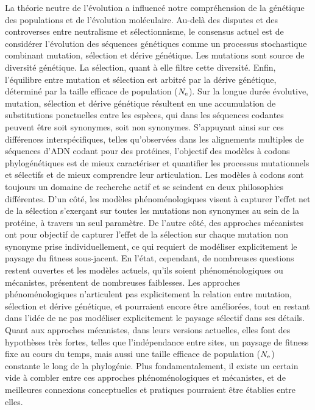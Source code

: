 La théorie neutre de l’évolution a influencé notre compréhension de la génétique des populations et de l'évolution moléculaire.
Au-delà des disputes et des controverses entre neutralisme et sélectionnisme, le consensus actuel est de considérer l'évolution des séquences génétiques comme un processus stochastique combinant mutation, sélection et dérive génétique.
Les mutations sont source de diversité génétique.
La sélection, quant à elle filtre cette diversité.
Enfin, l'équilibre entre mutation et sélection est arbitré par la dérive génétique, déterminé par la taille efficace de population ($N_{\text{e}}$).
Sur la longue durée évolutive, mutation, sélection et dérive génétique résultent en une accumulation de substitutions ponctuelles entre les espèces, qui dans les séquences codantes peuvent être soit synonymes, soit non synonymes.
S'appuyant ainsi sur ces différences interspécifiques, telles qu'observées dans les alignements multiples de séquences d’ADN codant pour des protéines, l'objectif des modèles à codons phylogénétiques est de mieux caractériser et quantifier les processus mutationnels et sélectifs et de mieux comprendre leur articulation.
Les modèles à codons sont toujours un domaine de recherche actif et se scindent en deux philosophies différentes.
D'un côté, les modèles phénoménologiques visent à capturer l'effet net de la sélection s'exerçant sur toutes les mutations non synonymes au sein de la protéine, à travers un seul paramètre.
De l'autre côté, des approches mécanistes ont pour objectif de capturer l'effet de la sélection sur chaque mutation non synonyme prise individuellement, ce qui requiert de modéliser explicitement le paysage du fitness sous-jacent.
En l'état, cependant, de nombreuses questions restent ouvertes et les modèles actuels, qu'ils soient phénoménologiques ou mécanistes, présentent de nombreuses faiblesses.
Les approches phénoménologiques n'articulent pas explicitement la relation entre mutation, sélection et dérive génétique, et pourraient encore être améliorées, tout en restant dans l'idée de ne pas modéliser explicitement le paysage sélectif dans ses détails.
Quant aux approches mécanistes, dans leurs versions actuelles, elles font des hypothèses très fortes, telles que l'indépendance entre sites, un paysage de fitness fixe au cours du temps, mais aussi une taille efficace de population ($N_{\text{e}}$) constante le long de la phylogénie.
Plus fondamentalement, il existe un certain vide à combler entre ces approches phénoménologiques et mécanistes, et de meilleures connexions conceptuelles et pratiques pourraient être établies entre elles.


